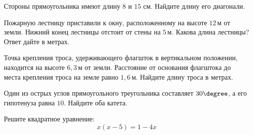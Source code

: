 \begin{homework}[number=1]
	\begin{listofex}
		\item Стороны прямоугольника имеют длину \( 8 \) и \( 15 \) см. Найдите длину его диагонали.
		\item Пожарную лестницу приставили к окну, расположенному на высоте \( 12 \) м от земли. Нижний конец лестницы отстоит от стены на \( 5 \) м. Какова длина лестницы? Ответ дайте в метрах.
		\item Точка крепления троса, удерживающего флагшток в вертикальном положении, находится на высоте \( 6,3 \) м от земли. Расстояние от основания флагштока до места крепления троса на земле равно \( 1,6 \) м. Найдите длину троса в метрах.
		\item Один из острых углов прямоугольного треугольника составляет \( 30\degree \), а его гипотенуза равна \( 10 \). Найдите оба катета.
		\item Решите квадратное уравнение:
		\[x(x-5)=1-4x\]
	\end{listofex}
\end{homework}

